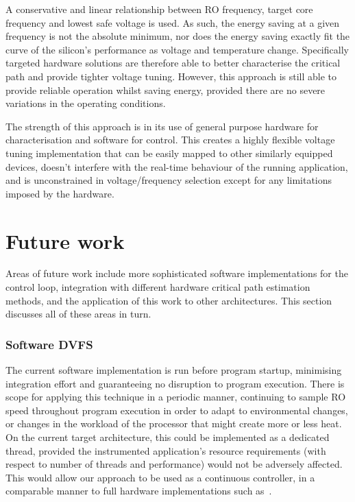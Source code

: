 \documentclass[a4paper,twocolumn,DIV=16]{scrartcl}
\begin{document}
A conservative and linear relationship between RO frequency, target core
frequency and lowest safe voltage is used. As such, the energy saving at a given
frequency is not the absolute minimum, nor does the energy saving exactly fit
the curve of the silicon's performance as voltage and temperature change.
Specifically targeted hardware solutions are therefore able to better
characterise the critical path and provide tighter voltage tuning.  However,
this approach is still able to provide reliable operation whilst saving energy,
provided there are no severe variations in the operating conditions.

The strength of this approach is in its use of general purpose hardware for
characterisation and software for control. This creates a highly flexible
voltage tuning implementation that can be easily mapped to other similarly
equipped devices, doesn't interfere with the real-time behaviour of the running
application, and is unconstrained in voltage/frequency selection except for any
limitations imposed by the hardware. 


\section{Future work}
\label{sec:future}

Areas of future work include more sophisticated software implementations for the
control loop, integration with different hardware critical path estimation
methods, and the application of this work to other architectures. This section
discusses all of these areas in turn.

\subsubsection*{Software DVFS}

The current software implementation is run before program startup, minimising
integration effort and guaranteeing no disruption to program execution. There is
scope for applying this technique in a periodic manner, continuing to sample RO
speed throughout program execution in order to adapt to environmental changes,
or changes in the workload of the processor that might create more or less heat.
On the current target architecture, this could be implemented as a dedicated
thread, provided the instrumented application's resource requirements (with
respect to number of threads and performance) would not be adversely affected.
This would allow our approach to be used as a continuous controller, in a
comparable manner to full hardware implementations such as~\cite{burd2000scaled,
das2006dvstuning, Liu2010}.
\end{document}
